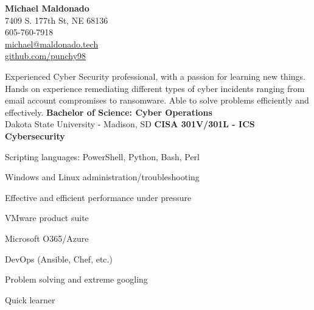 \documentclass[a4paper,10pt]{article}
\begin{document}
\begin{center}
    \textbf{\LARGE Michael Maldonado} \\
    7409 S. 177th St, NE 68136 \\
    605-760-7918 \\
    \href{mailto:michael@maldonado.tech}{michael@maldonado.tech} \\
    \href{https://github.com/punchy98}{github.com/punchy98}
\end{center}

Experienced Cyber Security professional, with a passion for learning new things. Hands on experience remediating different types of cyber incidents ranging from email account compromises to ransomware. Able to solve problems efficiently and effectively. 
\textbf{Bachelor of Science: Cyber Operations} \\
Dakota State University - Madison, SD 
\textbf{CISA 301V/301L - ICS Cybersecurity}
\begin{itemize}
    \begin{multicols}{2}
    \item Scripting languages: PowerShell, Python, Bash, Perl
    \item Windows and Linux administration/troubleshooting
    \item Effective and efficient performance under pressure
    \item VMware product suite
    \item Microsoft O365/Azure
    \item DevOps (Ansible, Chef, etc.)
    \item Problem solving and extreme googling
    \item Quick learner
    \end{multicols}
\end{itemize}

\end{document}
